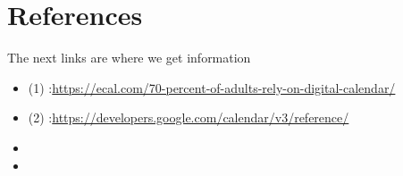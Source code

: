 \section{References}
\par The next links are where we get information
\begin{itemize}
	\item (1) :\url{https://ecal.com/70-percent-of-adults-rely-on-digital-calendar/}
	\item (2)
	:\url{https://developers.google.com/calendar/v3/reference/	}
	\item
	\item
\end{itemize}
